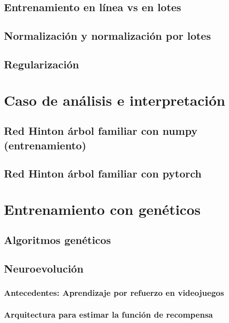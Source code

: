 \documentclass[12pt,openany]{book}
\begin{document}
\section{Entrenamiento en línea vs en lotes}
\section{Normalización y normalización por lotes}
\section{Regularización}

\chapter{Caso de análisis e interpretación}

\section{Red Hinton árbol familiar con numpy (entrenamiento)}

\section{Red Hinton árbol familiar con pytorch}

\chapter{Entrenamiento con genéticos}
\section{Algoritmos genéticos}
\section{Neuroevolución}
\subsection{Antecedentes: Aprendizaje por refuerzo en videojuegos}
\subsection{Arquitectura para estimar la función de recompensa}
\end{document}
